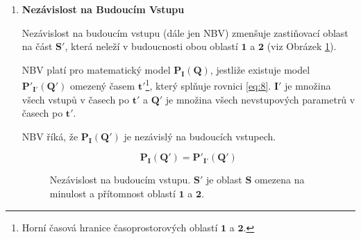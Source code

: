 \begin{enumerate}
    \item \textbf{Nezávislost na Budoucím Vstupu}
     
    Nezávislost na budoucím vstupu (dále jen NBV) zmenšuje zastiňovací oblast na část $\bm{S'}$, která neleží v budoucnosti obou oblastí $\bm{1}$ a $\bm{2}$ (viz Obrázek \ref{fig:8}).

    NBV platí pro matematický model $\bm{P_{I}(Q)}$, jestliže existuje model $\bm{P'_{I'}(Q')}$ omezený časem $\bm{t'}$\footnote[6]{Horní časová hranice časoprostorových oblastí $\bm{1}$ a $\bm{2}$.}, který splňuje rovnici \ref{eq:8}. $\bm{I'}$ je množina všech vstupů v časech po $\bm{t'}$  a $\bm{Q'}$ je množina všech nevstupových parametrů v časech po $\bm{t'}$.

    NBV říká, že $\bm{P_{I}(Q')}$ je nezávislý na budoucích vstupech.

    \begin{equation}
        \bm{P_{I}(Q') = P'_{I'}(Q')}
        \label{eq:8}
    \end{equation}

    \clearpage
    
    \begin{figure}[ht]

        \centering
    
        \caption{\label{fig:8}Nezávislost na budoucím vstupu. $\bm{S'}$ je oblast $\bm{S}$ omezena na minulost a přítomnost oblastí $\bm{1}$ a $\bm{2}$.}
    \end{figure}
    


\end{enumerate}

